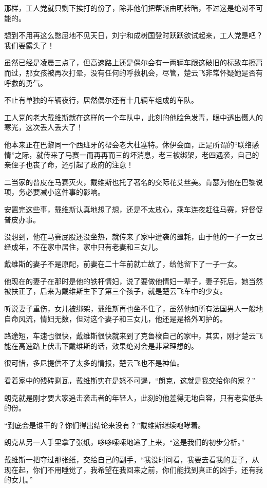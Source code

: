那样，工人党就只剩下挨打的份了，除非他们把帮派由明转暗，不过这是绝对不可能的。

想到不用再这么憋屈地不见天日，刘宁和成树国登时跃跃欲试起来，工人党是吧？我们要露头了！

虽然已经是凌晨三点了，但高速路上还是偶尔会有一两辆车跟这破旧的标致车擦肩而过，那女孩被再次打晕，没有任何的呼救机会，尽管，楚云飞非常怀疑她是否有呼救的勇气。

不止有单独的车辆夜行，居然偶尔还有十几辆车组成的车队。

工人党的老大戴维斯就在这样的一个车队中，此刻的他脸色发青，眼中透出慑人的寒光，这次丢人丢大了！

他本来正在巴黎同一个西班牙的帮会老大杜塞特。休伊会面，正是所谓的“联络感情”之际，就传来了马赛一而再再而三的坏消息，老三被绑架，老四遇袭，自己的亲侄子也丧了命，还引起了政府的注意！

二当家的普皮在马赛灭火，戴维斯也托了著名的交际花艾丝美。肯瑟为他在巴黎说项，务必要减小这件事的影响。

安置完这些事，戴维斯认真地想了想，还是不太放心，乘车连夜赶往马赛，好督促普皮办事。

没想到，他在马赛屁股还没坐热，就传来了家中遭袭的噩耗，由于他的一子一女已经成年，不在家中居住，家中只有老妻和三女儿。

戴维斯的妻子不是原配，前妻在二十年前就亡故了，给他留下了一子一女。

他现在的妻子在那时是他的铁杆情妇，说了要做他情妇一辈子，妻子死后，她当然被扶正了，后来为戴维斯生下了第三个孩子，就是楚云飞车中的少女。

听说妻子重伤，女儿被绑架，戴维斯再也坐不住了，虽然他如所有法国男人一般地自命风流，情妇无数，但对这个妻子和三女儿，他还是是格外呵护的。

路途短，车速也很快，戴维斯很快就来到了克鲁梭自己的家中，其实，刚才楚云飞能在高速路上伏击下戴维斯的话，效果绝对会是非常理想的。

很可惜，多尼提供不了太多的情报，楚云飞也不是神仙。

看着家中的残砖剩瓦，戴维斯实在是怒不可遏，“朗克，这就是我交给你的家？”

朗克就是刚才要大家追击袭击者的年轻人，此刻的他羞得无地自容，只有老实低头的份。

“到底会是谁干的？你们得出结论来没有？”戴维斯继续咆哮着。

朗克从另一人手里拿了张纸，哆哆嗦嗦地递了上来，“这是我们的初步分析。”

戴维斯一把夺过那张纸，交给自己的副手，“我没时间看，我要去看我的妻子，从现在起，你们不用睡觉了，我希望在我回来之前，你们能找到真正的凶手，还有我的女儿。”

